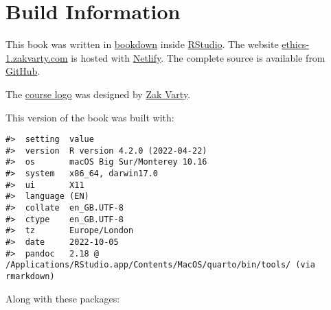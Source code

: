 \documentclass[
]{book}
\theoremstyle{definition}
\theoremstyle{definition}
\theoremstyle{definition}
\theoremstyle{definition}
\theoremstyle{remark}
\begin{document}
\hypertarget{build-information}{%
\chapter*{Build Information}\label{build-information}}

This book was written in \href{http://bookdown.org/}{bookdown} inside \href{http://www.rstudio.com/ide/}{RStudio}. The website \href{https://ethics-1.zakvarty.com}{ethics-1.zakvarty.com} is hosted with \href{https://www.netlify.com}{Netlify}. The complete source is available from \href{https://github.com/zakvarty/ethics-1}{GitHub}.

The \href{assets/ethics-1-logo.png}{course logo} was designed by \href{https://www.zakvarty.com/}{Zak Varty}.

This version of the book was built with:

\begin{verbatim}
#>  setting  value
#>  version  R version 4.2.0 (2022-04-22)
#>  os       macOS Big Sur/Monterey 10.16
#>  system   x86_64, darwin17.0
#>  ui       X11
#>  language (EN)
#>  collate  en_GB.UTF-8
#>  ctype    en_GB.UTF-8
#>  tz       Europe/London
#>  date     2022-10-05
#>  pandoc   2.18 @ /Applications/RStudio.app/Contents/MacOS/quarto/bin/tools/ (via rmarkdown)
\end{verbatim}

Along with these packages:
\end{document}
